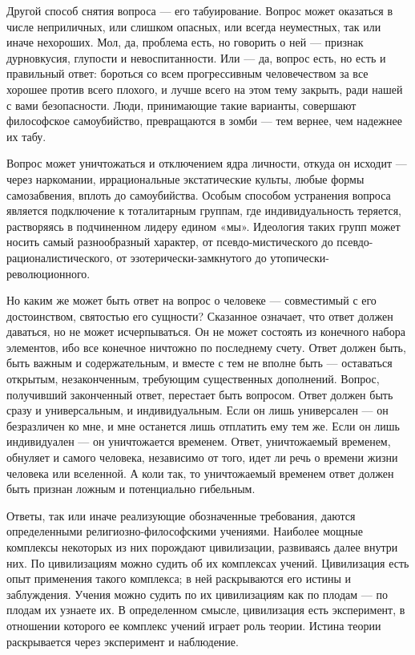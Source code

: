 \begin{multicols}{3}
Другой способ снятия вопроса — его табуирование. Вопрос может оказаться в числе
неприличных, или слишком опасных, или всегда неуместных, так или иначе
нехороших. Мол, да, проблема есть, но говорить о ней — признак дурновкусия,
глупости и невоспитанности. Или — да, вопрос есть, но есть и правильный ответ:
бороться со всем прогрессивным человечеством за все хорошее против всего
плохого, и лучше всего на этом тему закрыть, ради нашей с вами безопасности.
Люди, принимающие такие варианты, совершают философское самоубийство,
превращаются в зомби — тем вернее, чем надежнее их табу.

Вопрос может уничтожаться и отключением ядра личности, откуда он исходит —
через наркомании, иррациональные экстатические культы, любые формы
самозабвения, вплоть до самоубийства. Особым способом устранения вопроса
является подключение к тоталитарным группам, где индивидуальность теряется,
растворяясь в подчиненном лидеру едином «мы». Идеология таких групп может
носить самый разнообразный характер, от псевдо-мистического до
псевдо-рационалистического, от эзотерически-замкнутого до
утопически-революционного. 

Но каким же может быть ответ на вопрос о человеке — совместимый с его
достоинством, святостью его сущности? Сказанное означает, что ответ должен
даваться, но не может исчерпываться. Он не может состоять из конечного набора
элементов, ибо все конечное ничтожно по последнему счету. Ответ должен быть,
быть важным и содержательным, и вместе с тем не вполне быть — оставаться
открытым, незаконченным, требующим существенных дополнений. Вопрос, получивший
законченный ответ, перестает быть вопросом. Ответ должен быть сразу и
универсальным, и индивидуальным. Если он лишь универсален — он безразличен ко
мне, и мне останется лишь отплатить ему тем же. Если он лишь индивидуален — он
уничтожается временем. Ответ, уничтожаемый временем, обнуляет и самого
человека, независимо от того, идет ли речь о времени жизни человека или
вселенной. А коли так, то уничтожаемый временем ответ должен быть признан
ложным и потенциально гибельным.

Ответы, так или иначе реализующие обозначенные требования, даются определенными
религиозно-философскими учениями. Наиболее мощные комплексы некоторых из них
порождают цивилизации, развиваясь далее внутри них. По цивилизациям можно
судить об их комплексах учений. Цивилизация есть опыт применения такого
комплекса; в ней раскрываются его истины и заблуждения. Учения можно судить по
их цивилизациям как по плодам — по плодам их узнаете их. В определенном смысле,
цивилизация есть эксперимент, в отношении которого ее комплекс учений играет
роль теории. Истина теории раскрывается через эксперимент и наблюдение. 


\end{multicols}
